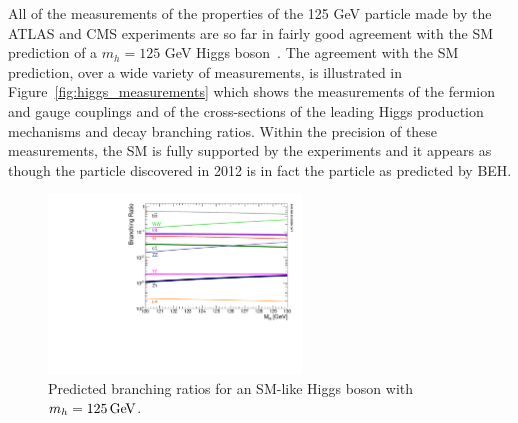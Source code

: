 All of the measurements of the properties of the 125 GeV particle
made by the ATLAS and CMS experiments are so far in fairly good agreement with the SM prediction
of a $m_h = 125$ GeV Higgs boson~\cite{HProp0,HProp1,HProp2,HProp3,HProp4,HProp5,HProp6,HProp7,HProp8}.
The agreement with the SM prediction, over a wide variety of measurements, is illustrated in
Figure~\ref{fig:higgs_measurements} which shows the measurements of the fermion and gauge
couplings and of the cross-sections of the leading Higgs production mechanisms and decay
branching ratios.
Within the precision of these measurements, the SM is fully supported by the experiments
and it appears as though the particle discovered in 2012 is in fact the particle as predicted
by BEH.

\begin{figure}[!htb]
    \begin{center}
        \includegraphics[width=0.6\textwidth]{figures/chapter1/sm_final/higgs_br_sm}
        \caption{
            Predicted branching ratios for an SM-like Higgs boson with $m_{h} = 125\,\text{Ge\kern -0.1em V}$.
        }
        \label{fig:higgs_br_sm}
    \end{center}
\end{figure}

